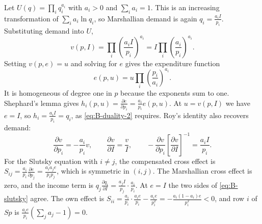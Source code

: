 \begin{example}\label{ex:B-cd-duality}
Let $U(q) = \prod_iq_i^{a_i}$ with $a_i > 0$ and $\sum_ia_i = 1$. This is an increasing transformation of
$\sum_ia_i\ln q_i$, so Marshallian demand is again $q_i = \frac{a_iI}{p_i}$. Substituting demand into $U$,
\begin{equation*}
v(p, I) = \prod_i\left(\frac{a_iI}{p_i}\right)^{a_i} = I\prod_i\left(\frac{a_i}{p_i}\right)^{a_i}.
\end{equation*}
Setting $v(p, e) = u$ and solving for $e$ gives the expenditure function
\begin{equation*}
e(p, u) = u\prod_i\left(\frac{p_i}{a_i}\right)^{a_i}.
\end{equation*}
It is homogeneous of degree one in $p$ because the exponents sum to one. Shephard's lemma gives
$h_i(p, u) = \frac{\partial e}{\partial p_i} = \frac{a_i}{p_i}e(p, u)$. At $u = v(p, I)$ we have $e = I$, so
$h_i = \frac{a_iI}{p_i} = q_i$, as \eqref{eq:B-duality-2} requires. Roy's identity also recovers demand:
\begin{equation*}
\frac{\partial v}{\partial p_i} = -\frac{a_i}{p_i}v, \qquad \frac{\partial v}{\partial I} = \frac{v}{I},
\qquad -\frac{\partial v}{\partial p_i}\left[\frac{\partial v}{\partial I}\right]^{-1} = \frac{a_iI}{p_i}.
\end{equation*}
For the Slutsky equation with $i \neq j$, the compensated cross effect is
$S_{ij} = \frac{a_i}{p_i}\frac{\partial e}{\partial p_j} = \frac{a_ia_je}{p_ip_j}$, which is symmetric in
$(i, j)$. The Marshallian cross effect is zero, and the income term is
$q_j\frac{\partial q_i}{\partial I} = \frac{a_jI}{p_j}\cdot\frac{a_i}{p_i}$. At $e = I$ the two sides of
\eqref{eq:B-slutsky} agree. The own effect is
$S_{ii} = \frac{a_i}{p_i}\cdot\frac{a_ie}{p_i} - \frac{a_ie}{p_i^2} = -\frac{a_i(1 - a_i)e}{p_i^2} < 0$, and
row $i$ of $Sp$ is $\frac{a_ie}{p_i}\left(\sum_ja_j - 1\right) = 0$.
\end{example}

